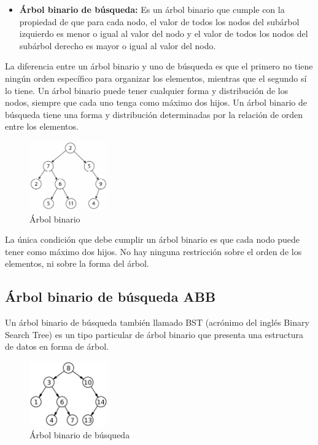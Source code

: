 \documentclass[../main.tex]{subfiles}
\begin{document}
        \begin{itemize}
            \item \textbf{Árbol binario de búsqueda:} Es un árbol binario que cumple con la propiedad de que para cada nodo, el valor de todos los nodos del subárbol izquierdo es menor o igual al valor del nodo y el valor de todos los nodos del subárbol derecho es mayor o igual al valor del nodo.
        \end{itemize}
        
        La diferencia entre un árbol binario y uno de búsqueda es que el primero no tiene ningún orden específico para organizar los elementos, mientras que el segundo sí lo tiene. Un árbol binario puede tener cualquier forma y distribución de los nodos, siempre que cada uno tenga como máximo dos hijos. Un árbol binario de búsqueda tiene una forma y distribución determinadas por la relación de orden entre los elementos.

        \begin{figure}[ht]
            \centering
            \includegraphics[width=0.3\textwidth]{images/arboles/arbol_binario.png}
            \caption{Árbol binario} 
        \end{figure}

        La única condición que debe cumplir un árbol binario es que cada nodo puede tener como máximo dos hijos. No hay ninguna restricción sobre el orden de los elementos, ni sobre la forma del árbol.\\

    \subsection{Árbol binario de búsqueda ABB}
        Un árbol binario de búsqueda también llamado BST (acrónimo del inglés Binary Search Tree) es un tipo particular de árbol binario que presenta una estructura de datos en forma de árbol.

        \begin{figure}[ht]
            \centering
            \includegraphics[width=0.3\textwidth]{images/arboles/ABB.png}
            \caption{Árbol binario de búsqueda} 
        \end{figure}
        
\end{document}
